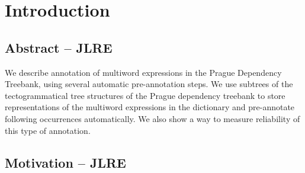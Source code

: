 \chapter{Introduction}
\label{sec:intro}
\section{Abstract – JLRE}
We describe annotation of multiword expressions in the Prague Dependency Treebank, using several automatic pre-annotation steps.
We use subtrees of the tectogrammatical tree structures of the Prague dependency treebank to store representations of the multiword expressions in the dictionary and pre-annotate following occurrences automatically.
We also show a way to measure reliability of this type of annotation. 




\section{Motivation – JLRE} 
\label{sec:intro:motiv}

